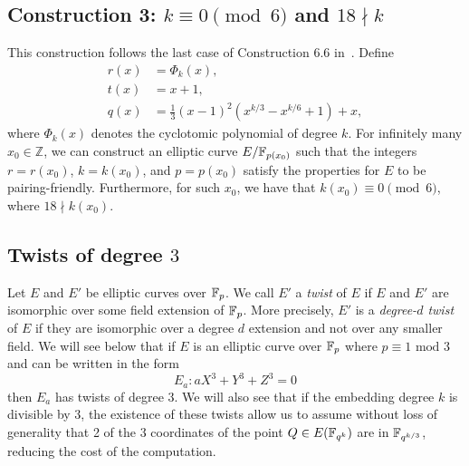 \subsection{Construction 3: $k \equiv 0 \pmod{6}$ and $18 \nmid k$}
This construction follows the last case of Construction 6.6 in~\cite{2010/freeman}.
Define
\begin{align*}
r(x) &= \Phi_k(x),	\\
t(x) &= x+1,		\\
q(x) &= \frac{1}{3} (x-1)^2 (x^{k/3} - x^{k/6} + 1) + x,
\end{align*}
where $\Phi_{k}(x)$ denotes the cyclotomic polynomial of degree $k$. For infinitely many $x_{0}\in \mathbb{Z}$, we can construct an elliptic curve $E/\mathbb{F}_{p(x_{0})}$ such that the integers $r=r(x_{0})$, $k=k(x_{0})$, and $p=p(x_{0})$ satisfy the properties for $E$ to be pairing-friendly. Furthermore, for such $x_{0}$, we have that
$k(x_{0}) \equiv 0 \pmod{6}$, where $18 \nmid k(x_{0})$.



\subsection{Twists of degree $3$}
\label{twist}
Let $E$ and $E'$ be elliptic curves over $\mathbb{F}_{p}$.
We call $E'$ a \emph{twist} of $E$ if $E$ and $E'$ are isomorphic over some field extension of $\mathbb{F}_{p}$.
More precisely, $E'$ is a {\emph{degree-$d$ twist}} of $E$ if they are isomorphic over a degree $d$ extension and not over any smaller field. We will see below that if $E$ is an elliptic curve over $\mathbb{F}_{p}$ where $p \equiv 1 \text{ mod } 3$ and can be written in the form
\[E_{a}: aX^{3} + Y^{3} + Z^{3} = 0\]
then $E_{a}$ has twists of degree 3. We will also see that if the embedding degree $k$ is divisible by 3, the existence of these twists allow us to assume without loss of generality that 2 of the 3 coordinates of the point $Q \in E(\mathbb{F}_{q^{k}})$ are in $\mathbb{F}_{q^{k/3}}$, reducing the cost of the computation.

